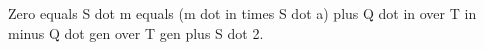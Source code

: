 Zero equals S dot m equals (m dot in times S dot a) plus Q dot in over T in minus Q dot gen over T gen plus S dot 2.
